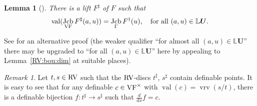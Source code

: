 \documentclass[12pt]{amsart}
\theoremstyle{plain}
\newtheorem{lem}[thm]{Lemma}
\theoremstyle{definition}
\theoremstyle{remark}
\newtheorem{rem}[thm]{Remark}
\numberwithin{equation}{section}
\theoremstyle{plain}
\newcommand{\VF}{\textup{VF}}
\newcommand{\RV}{\textup{RV}}
\DeclareMathOperator{\jcb}{Jcb}
\newcommand{\0}{\emptyset}
\newcommand{\bb}[1]{\mathbb{#1}}
\newcommand{\fun}{\longrightarrow}
\DeclareMathOperator{\vv}{val}
\DeclareMathOperator{\vrv}{vrv}
\newcommand{\ddx}{\tfrac{d}{d x}}
\begin{document}


\begin{lem}[{\cite[Lemma~6.3]{hrushovski:kazhdan:integration:vf}}]\label{iso:lifted:vol}
There is a lift $F^{\sharp}$ of $F$ such that
\begin{equation}\label{jac:mat}
\vv(\jcb_{\VF} F^{\sharp}(a,  u)) = \jcb_{\Gamma} F^\dag(u), \quad \text{for all } (a, u) \in \bb L \bm U.
\end{equation}
\end{lem}

See \cite[Corollary~7.7]{Yin:special:trans} for an alternative proof (the weaker qualifier ``for almost all $(a, u) \in \bb L \bm U$'' there may be upgraded to ``for all $(a, u) \in \bb L \bm U$'' here by appealing to Lemma~\ref{RV:bou:dim} at suitable places).

\begin{rem}\label{rvdisc:stre}
Let $t, s \in \RV$ such that the $\RV$-discs $t^\sharp$, $s^\sharp$ contain definable points. It is easy to see that for any definable $c \in \VF^\times$ with $\vv(c) = \vrv(s/t)$, there is a definable bijection $f : t^\sharp \fun s^\sharp$ such that $\ddx f = c$.
\end{rem}
\end{document}
